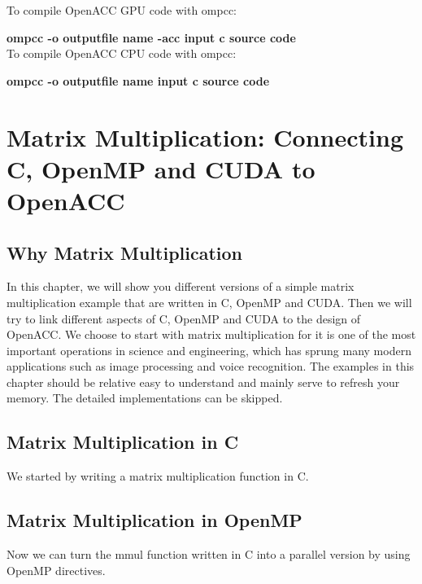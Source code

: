 \documentclass[ebook,10pt,oneside,openany]{memoir}
\begin{document}


To compile OpenACC GPU code with ompcc:

\textbf{ompcc -o \textlangle{}outputfile name\textrangle{} -acc \textlangle{}input c source code\textrangle{}} \\

To compile OpenACC CPU code with ompcc:

\textbf{ompcc -o \textlangle{}outputfile name\textrangle{} \textlangle{}input c source code\textrangle{}}

\chapter{Matrix Multiplication: Connecting C, OpenMP and CUDA to OpenACC}

\section{Why Matrix Multiplication}

In this chapter, we will show you different versions of a simple matrix multiplication example that are written in C, OpenMP and CUDA. Then we will try to link different aspects of C, OpenMP and CUDA to the design of OpenACC. We choose to start with matrix multiplication for it is one of the most important operations in science and engineering, which has sprung many modern applications such as image processing and voice recognition. The examples in this chapter should be relative easy to understand and mainly serve to refresh your memory. The detailed implementations can be skipped.

\section{Matrix Multiplication in C}

We started by writing a matrix multiplication function in C.



\section{Matrix Multiplication in OpenMP}

Now we can turn the mmul function written in C into a parallel version by using OpenMP directives. \\
\end{document}
